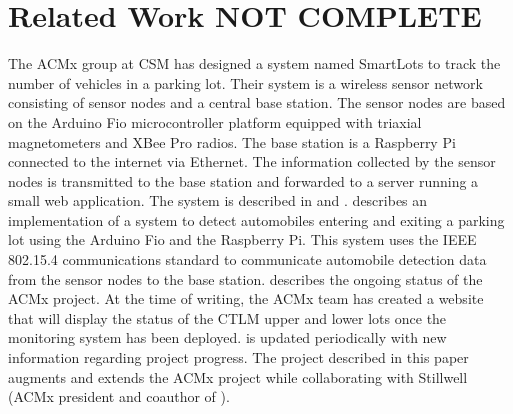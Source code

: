 \documentclass[11pt, oneside, fullpage, doublespace]{article}
\begin{document}
\section{Related Work {\color{red}\textbf{NOT COMPLETE}} }
The ACMx group at CSM has designed a system named SmartLots to track the number of vehicles in a parking lot. Their system is a wireless sensor network consisting of sensor nodes and a central base station. The sensor nodes are based on the Arduino Fio microcontroller platform equipped with triaxial magnetometers and XBee Pro radios. The base station is a Raspberry Pi connected to the internet via Ethernet. The information collected by the sensor nodes is transmitted to the base station and forwarded to a server running a small web application. The system is described in \cite{stillwell2013} and \cite{parkingWiki}. \cite{stillwell2013} describes an implementation of a system to detect automobiles entering and exiting a parking lot using the Arduino Fio and the Raspberry Pi. This system uses the IEEE 802.15.4 communications standard to communicate automobile detection data from the sensor nodes to the base station. \cite{parkingWiki} describes the ongoing status of the ACMx project. At the time of writing, the ACMx team has created a website that will display the status of the CTLM upper and lower lots once the monitoring system has been deployed. \cite{parkingWiki} is updated periodically with new information regarding project progress. The project described in this paper augments and extends the ACMx project while collaborating with Stillwell (ACMx president and coauthor of \cite{stillwell2013}).
\end{document}
